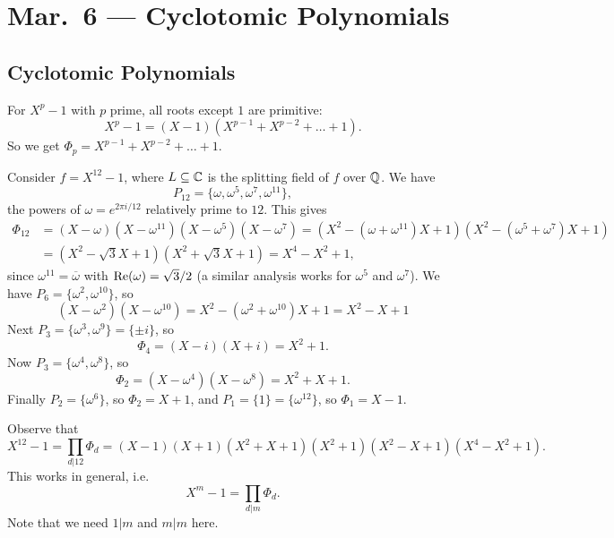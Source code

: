 \chapter{Mar.~6 --- Cyclotomic Polynomials}

\section{Cyclotomic Polynomials}

\begin{example}
  For $X^p - 1$ with $p$ prime, all roots except
  $1$ are primitive:
  \[
    X^p - 1 = (X - 1)(X^{p - 1} + X^{p - 2} + \dots + 1).
  \]
  So we get $\Phi_p = X^{p - 1} + X^{p - 2} + \dots + 1$.
\end{example}

\begin{example}
  Consider $f = X^{12} - 1$, where $L \subseteq \mathbb{C}$ is
  the splitting field of $f$ over $\mathbb{Q}$. We have
  \[
    P_{12} = \{\omega, \omega^5, \omega^7, \omega^{11}\},
  \]
  the powers of $\omega = e^{2\pi i / 12}$ relatively
  prime to $12$. This gives
  \begin{align*}
    \Phi_{12}
    &= (X - \omega)(X - \omega^{11})(X - \omega^5)(X - \omega^7)
    = (X^2 - (\omega + \omega^{11})X + 1)(X^2 - (\omega^5 + \omega^7)X + 1) \\
    &= (X^2 - \sqrt{3}X + 1)(X^2 + \sqrt{3}X + 1)
    = X^4 - X^2 + 1,
  \end{align*}
  since $\omega^{11} = \overline{\omega}$ with
  $\operatorname{Re}(\omega) = \sqrt{3} / 2$ (a similar analysis works
  for $\omega^5$ and $\omega^7$).
  We have $P_6 = \{\omega^2, \omega^{10}\}$, so
  \[
    (X - \omega^2)(X - \omega^{10}) = X^2 - (\omega^2 + \omega^{10})X + 1
    = X^2 - X + 1
  \]
  Next $P_3 = \{\omega^3, \omega^9\} = \{\pm i\}$, so
  \[
    \Phi_4 = (X - i)(X + i) = X^2 + 1.
  \]
  Now $P_3 = \{\omega^4, \omega^8\}$, so
  \[
    \Phi_2 = (X - \omega^4)(X - \omega^8) = X^2 + X + 1.
  \]
  Finally $P_2 = \{\omega^6\}$, so
  $\Phi_2 = X + 1$, and $P_1 = \{1\} = \{\omega^{12}\}$,
  so $\Phi_1 = X - 1$.
\end{example}

\begin{remark}
  Observe that
  \[
    X^{12} - 1 = \prod_{d | 12} \Phi_d
    = (X - 1)(X + 1)(X^2 + X + 1)(X^2 + 1)(X^2 - X + 1)(X^4 - X^2 + 1).
  \]
  This works in general, i.e.
  \[
    X^m - 1 = \prod_{d | m} \Phi_d.
  \]
  Note that we need $1 | m$ and $m | m$ here.
\end{remark}

